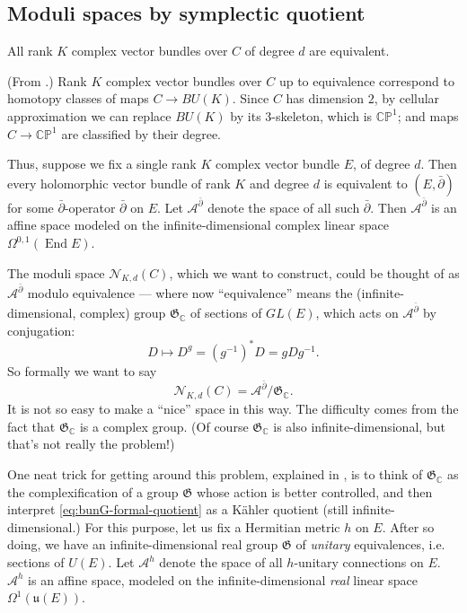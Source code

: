 \documentclass[12pt,letterpaper,reqno]{article}
\numberwithin{equation}{section}
\newcommand{\fu}{{\mathfrak u}}
\newcommand{\fG}{{\mathfrak G}}
\newcommand{\cN}{\ensuremath{\mathcal N}}
\newcommand{\cA}{\ensuremath{\mathcal A}}
\newcommand{\C}{\ensuremath{\mathbb C}}
\newcommand{\PP}{\ensuremath{\mathbb P}}
\newcommand{\kahler}{K\"ahler\xspace}
\newcommand{\ti}[1]{\textit{#1}}
\DeclareMathOperator{\End}{End}
\begin{document}
\subsection{Moduli spaces by symplectic quotient}

\begin{prop}
All rank $K$ complex vector bundles over $C$ of degree $d$ are equivalent.
\end{prop}

\begin{pf} (From \cite{MR98b:14010}.) Rank $K$
complex vector bundles over $C$ up to equivalence correspond
to homotopy classes of maps $C \to BU(K)$. Since $C$ has dimension $2$,
by cellular approximation
we can replace $BU(K)$ by its 3-skeleton, which is $\C\PP^1$;
and maps $C \to \C\PP^1$ are classified by their degree.
\end{pf}

Thus, suppose we fix a single rank $K$ complex vector bundle $E$,
of degree $d$. Then every holomorphic vector bundle of rank $K$
and degree $d$ is equivalent to $(E, \bar\partial)$ for some
$\bar\partial$-operator $\bar\partial$ on $E$.
Let $\cA^{\bar\partial}$ denote the space of all such $\bar\partial$.
Then $\cA^{\bar\partial}$ is an affine space modeled on the
infinite-dimensional complex linear space $\Omega^{0,1}(\End E)$.

The moduli space $\cN_{K,d}(C)$, which we want to construct,
could be thought of as
$\cA^{\bar\partial}$ modulo equivalence --- where now ``equivalence'' means
the (infinite-dimensional,
complex) group $\fG_\C$ of sections of $GL(E)$,
which acts on $\cA^{\bar\partial}$ by conjugation:
\begin{equation}
  D \mapsto D^g = (g^{-1})^* D = g D g^{-1}.
\end{equation}
So formally we want to say
\begin{equation} \label{eq:bunG-formal-quotient}
  \cN_{K,d}(C) = \cA^{\bar\partial} / \fG_\C.
\end{equation}
It is not so easy to make a ``nice'' space in this way.
The difficulty comes from the
fact that $\fG_\C$ is a complex group.
(Of course $\fG_\C$ is also infinite-dimensional,
but that's not really the problem!)

One neat trick for getting around this problem,
explained in \cite{MR85k:14006},
is to think of $\fG_\C$ as the complexification of a
group $\fG$ whose action is better controlled, and
then interpret \eqref{eq:bunG-formal-quotient}
as a \kahler quotient (still infinite-dimensional.)
For this purpose, let us fix a Hermitian metric $h$ on $E$.
After so doing, we have an infinite-dimensional real group
$\fG$ of \ti{unitary} equivalences, i.e. sections of $U(E)$.
Let $\cA^h$ denote the space of all $h$-unitary connections
on $E$.
$\cA^h$ is an affine space, modeled
on the infinite-dimensional \ti{real} linear space $\Omega^{1}(\fu(E))$.
\end{document}
